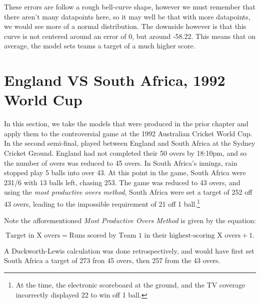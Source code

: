 These errors are follow a rough bell-curve shape, however we must remember that there aren't many datapoints here, so it may well be that with more datapoints, we would see more of a normal distribution. The downside however is 
that this curve is not centered around an error of 0, but around -58.22. This means that on average, the model sets teams a target of a much higher score. 

\section{England VS South Africa, 1992 World Cup}
In this section, we take the models that were produced in the prior chapter and apply them to the controversial game at the 1992 Australian Cricket World Cup. In the second semi-final,
played between England and South Africa at the Sydney Cricket Ground. England had not completed their 50 overs by 18:10pm, and so the number of overs was reduced to 45 overs. In South Africa's
innings, rain stopped play 5 balls into over 43. At this point in the game, South Africa were 231/6 with 13 balls left, chasing 253. The game was reduced to 43 overs, and using the \textit{most 
productive overs method}, South Africa were set a target of 252 off 43 overs, leading to the impossible requirement of 21 off 1 ball.\footnote{At the time, the electronic scoreboard at the ground,
and the TV coverage incorrectly displayed 22 to win off 1 ball.}

Note the afforementioned \textit{Most Productive Overs Method} is given by the equation:

\begin{equation}
    \text{Target in X overs} = \text{Runs scored by Team 1 in their highest-scoring X overs} + 1.
\end{equation}

A Duckworth-Lewis calculation was done retrospectively, and would have first set South Africa a target of 273 fron 45 overs, then 257 from the 43 overs.


